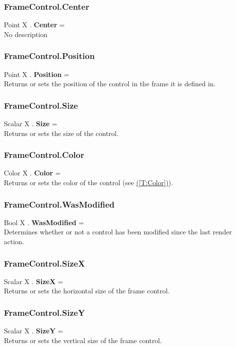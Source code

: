 \documentclass[10pt]{book}
\newcommand{\linkitem}[1]{\hyperref[#1]{\nameref{#1} (\ref{#1})}}
\begin{document}
\subsubsection{FrameControl.Center \label{F:FrameControl:Center}}
Point X . \textbf{Center} = \\
No description

\subsubsection{FrameControl.Position \label{F:FrameControl:Position}}
Point X . \textbf{Position} = \\
Returns or sets the position of the control in the frame it is defined in.

\subsubsection{FrameControl.Size \label{F:FrameControl:Size}}
Scalar X . \textbf{Size} = \\
Returns or sets the size of the control.

\subsubsection{FrameControl.Color \label{F:FrameControl:Color}}
Color X . \textbf{Color} = \\
Returns or sets the color of the control (see \linkitem{T:Color}).

\subsubsection{FrameControl.WasModified \label{F:FrameControl:WasModified}}
Bool X . \textbf{WasModified} = \\
Determines whether or not a control has been modified since the last render action.

\subsubsection{FrameControl.SizeX \label{F:FrameControl:SizeX}}
Scalar X . \textbf{SizeX} = \\
Returns or sets the horizontal size of the frame control.

\subsubsection{FrameControl.SizeY \label{F:FrameControl:SizeY}}
Scalar X . \textbf{SizeY} = \\
Returns or sets the vertical size of the frame control.
\end{document}
